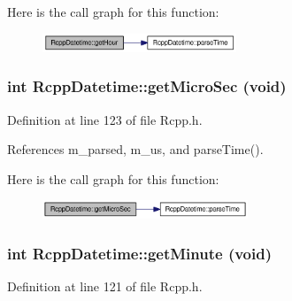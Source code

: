 Here is the call graph for this function:\nopagebreak
\begin{figure}[H]
\begin{center}
\leavevmode
\includegraphics[width=164pt]{classRcppDatetime_0da8db1ecd235a6e7ab309e70e4e93b0_cgraph}
\end{center}
\end{figure}
\hypertarget{classRcppDatetime_cdf9e19f28c84fde38c352df5f225999}{
\subsubsection[{getMicroSec}]{\setlength{\rightskip}{0pt plus 5cm}int RcppDatetime::getMicroSec (void)}}
\label{classRcppDatetime_cdf9e19f28c84fde38c352df5f225999}




Definition at line 123 of file Rcpp.h.

References m\_\-parsed, m\_\-us, and parseTime().

Here is the call graph for this function:\nopagebreak
\begin{figure}[H]
\begin{center}
\leavevmode
\includegraphics[width=174pt]{classRcppDatetime_cdf9e19f28c84fde38c352df5f225999_cgraph}
\end{center}
\end{figure}
\hypertarget{classRcppDatetime_db41bd524ead66d69e129b1f2767358a}{
\subsubsection[{getMinute}]{\setlength{\rightskip}{0pt plus 5cm}int RcppDatetime::getMinute (void)}}
\label{classRcppDatetime_db41bd524ead66d69e129b1f2767358a}




Definition at line 121 of file Rcpp.h.

